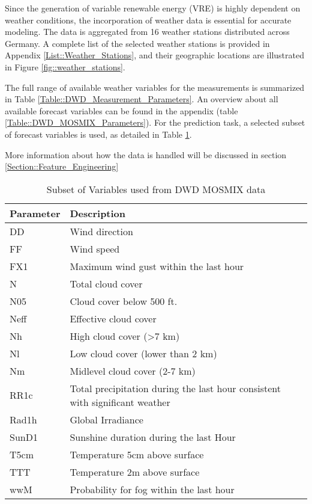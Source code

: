 \documentclass[class=scrbook, crop=false]{standalone}
\begin{document}
Since the generation of variable renewable energy (VRE) is highly dependent on weather conditions, the incorporation of weather data is essential for accurate modeling.
The data is aggregated from 16 weather stations distributed across Germany.
A complete list of the selected weather stations is provided in Appendix \ref{List::Weather_Stations}, and their geographic locations are illustrated in Figure \ref{fig::weather_stations}.

The full range of available weather variables for the measurements is summarized in Table \ref{Table::DWD_Measurement_Parameters}.
An overview about all available forecast variables can be found in the appendix (table \ref{Table::DWD_MOSMIX_Parameters}).
For the prediction task, a selected subset of forecast variables is used, as detailed in Table \ref{Table::DWD_MOSMIX_Parameters_Small}.


More information about how the data is handled will be discussed in section \ref{Section::Feature_Engineering}


\begin{table}[]
\begin{tabular}{l|l}
Parameter & Description \\\hline
DD & Wind direction\\
FF & Wind speed\\
FX1 & Maximum wind gust within the last hour\\
N & Total cloud cover\\
N05 & Cloud cover below 500 ft.\\
Neff & Effective cloud cover\\
Nh & High cloud cover (>7 km)\\
Nl & Low cloud cover (lower than 2 km)\\
Nm & Midlevel cloud cover (2-7 km)\\
RR1c & Total precipitation during the last hour consistent with significant weather\\
Rad1h & Global Irradiance\\
SunD1 & Sunshine duration during the last Hour\\
T5cm & Temperature 5cm above surface\\
TTT & Temperature 2m above surface\\
wwM & Probability for fog within the last hour\\
\end{tabular}
\caption{Subset of Variables used from DWD MOSMIX data}
\label{Table::DWD_MOSMIX_Parameters_Small}
\end{table}
\end{document}
